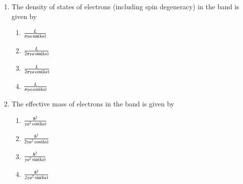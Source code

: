 \documentclass[journal]{IEEEtran}
\begin{document}
\begin{enumerate}
    \item The density of states of electrons (including spin degeneracy) in the band is given by
    \begin{multicols}{4}
        \begin{enumerate}
            \item $\frac{L}{\pi \gamma a \sin\left(ka\right)}$
            \item $\frac{L}{2\pi \gamma a \sin\left(ka\right)}$
            \item $\frac{L}{2\pi \gamma a \cos\left(ka\right)}$
            \item $\frac{L}{\pi \gamma a \cos\left(ka\right)}$
        \end{enumerate}
    \end{multicols}
    
    \item The effective mass of electrons in the band is given by
    \begin{multicols}{4}
        \begin{enumerate}
            \item $\frac{\hbar^2}{\gamma a^2 \cos\left(ka\right)}$
            \item $\frac{\hbar^2}{2\gamma a^2 \cos\left(ka\right)}$
            \item $\frac{\hbar^2}{\gamma a^2 \sin\left(ka\right)}$
            \item $\frac{\hbar^2}{2\gamma a^2 \sin\left(ka\right)}$
        \end{enumerate}
    \end{multicols}
\end{enumerate}
\end{document}
